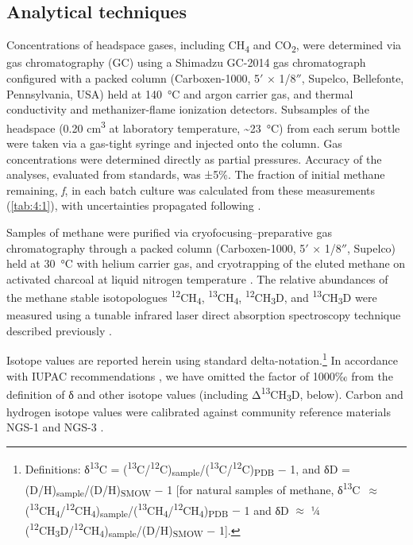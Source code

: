 \subsection{Analytical techniques}\label{sec:4:analytical-techniques}

Concentrations of headspace gases, including CH\textsubscript{4} and
CO\textsubscript{2}, were determined via gas chromatography (GC) using a
Shimadzu GC-2014 gas chromatograph configured with a packed column
(Carboxen-1000, 5$'$ × 1/8$''$, Supelco, Bellefonte, Pennsylvania, USA) held
at 140~°C and argon carrier gas, and thermal conductivity and
methanizer-flame ionization detectors. Subsamples of the headspace (0.20
cm\textsuperscript{3} at laboratory temperature, \textasciitilde{}23~°C)
from each serum bottle were taken via a gas-tight syringe and injected
onto the column. Gas concentrations were determined directly as partial
pressures. Accuracy of the analyses, evaluated from standards, was ±5\%.
The fraction of initial methane remaining, \emph{f}, in each batch
culture was calculated from these measurements (\autoref{tab:4:1}), with
uncertainties propagated following \textcite{Ku_1969_JResNBS}.

Samples of methane were purified via cryofocusing--preparative gas
chromatography through a packed column (Carboxen-1000, 5$'$ × 1/8$''$,
Supelco) held at 30~°C with helium carrier gas, and cryotrapping of the
eluted methane on activated charcoal at liquid nitrogen temperature
\parencite{Wang++_2015_S}. The relative abundances of the methane stable
isotopologues \textsuperscript{12}CH\textsubscript{4},
\textsuperscript{13}CH\textsubscript{4},
\textsuperscript{12}CH\textsubscript{3}D, and
\textsuperscript{13}CH\textsubscript{3}D were measured using a tunable
infrared laser direct absorption spectroscopy technique described
previously \parencite{Ono++_2014_AC,Wang++_2015_S}.

Isotope values are reported herein using standard
delta-notation.\footnote{Definitions: δ\textsuperscript{13}C =
	(\textsuperscript{13}C/\textsuperscript{12}C)\textsubscript{sample}/(\textsuperscript{13}C/\textsuperscript{12}C)\textsubscript{PDB}
	$-$ 1, and δD = (D/H)\textsubscript{sample}/(D/H)\textsubscript{SMOW} $-$
	1 {[}for natural samples of methane, δ\textsuperscript{13}C~$\approx$~	(\textsuperscript{13}CH\textsubscript{4}/\textsuperscript{12}CH\textsubscript{4})\textsubscript{sample}/(\textsuperscript{13}CH\textsubscript{4}/\textsuperscript{12}CH\textsubscript{4})\textsubscript{PDB}
	$-$ 1 and δD $\approx$ ¼
	(\textsuperscript{12}CH\textsubscript{3}D/\textsuperscript{12}CH\textsubscript{4})\textsubscript{sample}/(D/H)\textsubscript{SMOW}
	$-$ 1{]}.} In accordance with IUPAC recommendations \parencite{Coplen_2011_RCM}, we
have omitted the factor of 1000‰ from the definition of δ and other
isotope values (including Δ\textsuperscript{13}CH\textsubscript{3}D,
below). Carbon and hydrogen isotope values were calibrated against
community reference materials NGS-1 and NGS-3 \parencite{Wang++_2015_S}.

